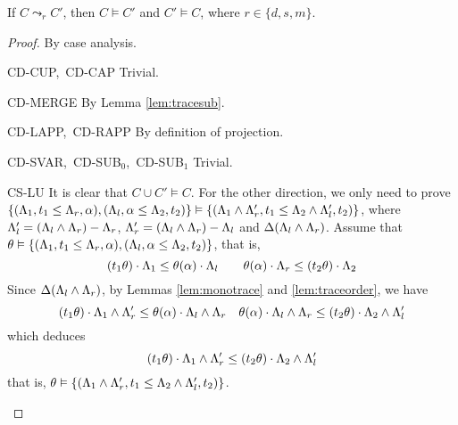 {{{\begin{lemma}\label{lem:consolcorrect}
If $C\leadsto_{r} C'$, then $C\vDash C'$ and $C' \vDash C$, where $r\in \{d,s,m\}$.
\end{lemma}

\begin{proof} By case analysis.
\begin{ProofEnumDesc}
\item[CD-CUP,~CD-CAP] Trivial.
\item[CD-MERGE]
By Lemma \ref{lem:tracesub}.
\item[CD-LAPP,~CD-RAPP] By definition of projection.
\item[CD-SVAR,~CD-SUB$_0$,~CD-SUB$_1$] Trivial.
\item[CS-LU]
It is clear that $C\cup C' \vDash C$.
For the other direction, we only need to prove
$\{(\Lambda_1, t_1 \leq \Lambda_r, \alpha ),(\Lambda_l, \alpha \leq \Lambda_2, t_2)\} \vDash
\{(\Lambda_1\land\Lambda'_r, t_1\leq \Lambda_2\land\Lambda'_l, t_2) \}$, where $\Lambda'_l = (\Lambda_l\land \Lambda_r)  - \Lambda_r$, $\Lambda'_r =(\Lambda_l\land \Lambda_r) - \Lambda_l$ and $\Delta(\Lambda_l\land\Lambda_r)$.
Assume that $\theta \vDash  \{(\Lambda_1, t_1 \leq \Lambda_r, \alpha ),(\Lambda_l, \alpha \leq \Lambda_2, t_2)\} $, that is,
\begin{equation*}
 (t_1\theta)\cdot\Lambda_{1} \leq \theta(\alpha)\cdot\Lambda_{l}
\quad\quad
 \theta(\alpha)\cdot\Lambda_{r} \leq (t_2\theta)\cdot\Lambda_{2}
\end{equation*}
Since $\Delta(\Lambda_l\land\Lambda_r)$, by Lemmas \ref{lem:monotrace} and \ref{lem:traceorder}, we have
\begin{equation*}
 (t_1\theta)\cdot\Lambda_{1} \land\Lambda'_r \leq \theta(\alpha)\cdot\Lambda_{l}\land\Lambda_r
\quad
 \theta(\alpha)\cdot\Lambda_{l}\land\Lambda_r \leq (t_2\theta)\cdot\Lambda_{2} \land\Lambda'_l
\end{equation*}
which deduces
\begin{equation*}
(t_1\theta)\cdot\Lambda_{1} \land\Lambda'_r \leq (t_2\theta)\cdot\Lambda_{2} \land\Lambda'_l
\end{equation*}
that is, $\theta \vDash \{(\Lambda_1\land\Lambda'_r, t_1\leq \Lambda_2\land\Lambda'_l, t_2) \}$.


\end{ProofEnumDesc}
\end{proof}}}}
